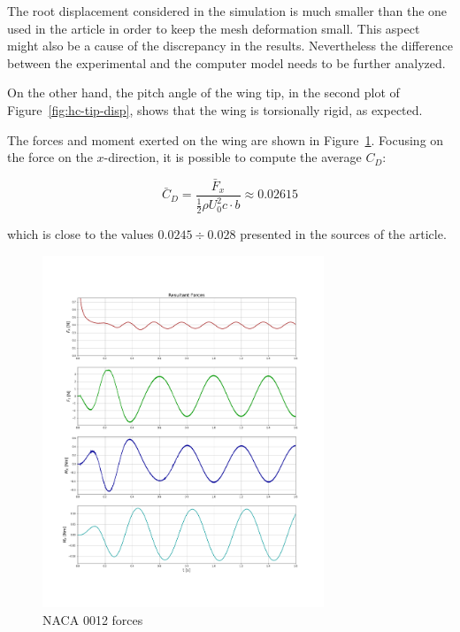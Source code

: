 The root displacement considered in the simulation is much smaller than the one used in the article in order to keep the mesh deformation small. This aspect might also be a cause of the discrepancy in the results.
Nevertheless the difference between the experimental and the computer model needs to be further analyzed.

On the other hand, the pitch angle of the wing tip, in the second plot of Figure~\ref{fig:hc-tip-disp}, shows that the wing is torsionally rigid, as expected.

The forces and moment exerted on the wing are shown in Figure~\ref{fig:hc-wing-forces}. Focusing on the force on the $x$-direction, it is possible to compute the  average $C_D$:

\begin{equation}
 \bar{C}_D  = \frac{\bar{F}_x}{\frac{1}{2} \rho U_0^2 c\cdot b} \approx 0.02615   
\end{equation}

which is close to the values $0.0245\div0.028$ presented in the sources of the article.

\begin{figure}[htbp!]
	\centering
	\includegraphics[width=0.75\textwidth, trim=0 150 0 150, clip]{images/heathcote/forces_naca0012.png}
	\caption{NACA 0012 forces}
	\label{fig:hc-wing-forces}
\end{figure}



